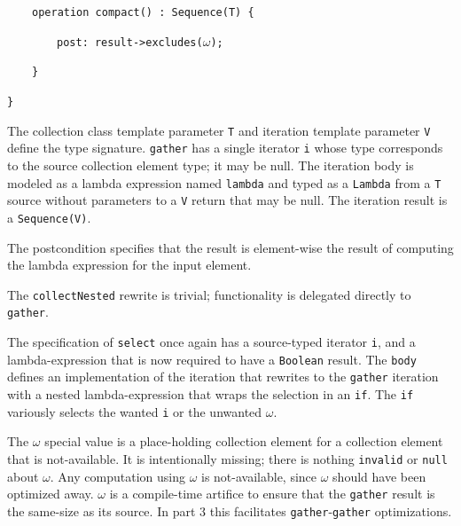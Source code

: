 \documentclass[
]{ceurart}
\begin{document}
\begin{description}[itemsep=-0.2cm]\vspace{-10pt}\small\begin{samepage}
\item ~~~~\verb!operation compact() : Sequence(T) {!
\item ~~~~~~~~\verb!post: result->excludes(!$\omega$\verb!);!
\item ~~~~\verb!}!
\item \verb!}!
\end{samepage}\vspace{-10pt}\end{description}

The collection class template parameter \verb!T! and iteration template parameter \verb!V! define the type signature. \verb!gather! has a single iterator \verb!i! whose type corresponds to the source collection element type; it may be null. The iteration body is modeled as a lambda expression named \verb!lambda! and typed as a \verb!Lambda! from a \verb!T! source without parameters to a \verb!V! return that may be null. The iteration result is a \verb!Sequence(V)!.


The postcondition specifies that the result is element-wise the result of computing the lambda expression for the input element.

The \verb!collectNested! rewrite is trivial; functionality is delegated directly to \verb!gather!. 

The specification of \verb!select! once again has a source-typed iterator \verb!i!, and a lambda-expression that is now required to have a \verb!Boolean! result. The \verb!body! defines an implementation of the iteration that rewrites to the \verb!gather! iteration with a nested lambda-expression that wraps the selection in an \verb!if!. The \verb!if! variously selects the wanted \verb!i! or the unwanted $\omega$.

The $\omega$ special value is a place-holding collection element for a collection element that is not-available. It is intentionally missing; there is nothing \verb!invalid! or \verb!null! about $\omega$. Any computation using $\omega$ is not-available, since $\omega$ should have been optimized away.  $\omega$ is a compile-time artifice to ensure that the \verb!gather! result is the same-size as its source. In part 3 \cite{Willink-Collections3} this facilitates \verb!gather!-\verb!gather! optimizations.
\end{document}
